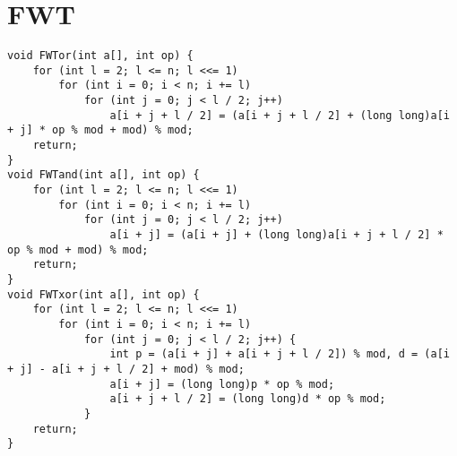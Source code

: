 \section{FWT}

\begin{verbatim}
void FWTor(int a[], int op) {
    for (int l = 2; l <= n; l <<= 1)
        for (int i = 0; i < n; i += l)
            for (int j = 0; j < l / 2; j++)
                a[i + j + l / 2] = (a[i + j + l / 2] + (long long)a[i + j] * op % mod + mod) % mod;
    return;
}
void FWTand(int a[], int op) {
    for (int l = 2; l <= n; l <<= 1)
        for (int i = 0; i < n; i += l)
            for (int j = 0; j < l / 2; j++)
                a[i + j] = (a[i + j] + (long long)a[i + j + l / 2] * op % mod + mod) % mod;
    return;
}
void FWTxor(int a[], int op) {
    for (int l = 2; l <= n; l <<= 1)
        for (int i = 0; i < n; i += l)
            for (int j = 0; j < l / 2; j++) {
                int p = (a[i + j] + a[i + j + l / 2]) % mod, d = (a[i + j] - a[i + j + l / 2] + mod) % mod;
                a[i + j] = (long long)p * op % mod;
                a[i + j + l / 2] = (long long)d * op % mod;
            }
    return;
}
\end{verbatim}